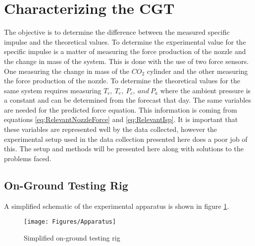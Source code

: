 \section{Characterizing the CGT}
The objective is to determine the difference between the measured specific impulse and the theoretical values. To determine the experimental value for the specific impulse is a matter of measuring the force production of the nozzle and the change in mass of the system. This is done with the use of two force sensors. One measuring the change in mass of the $CO_2$ cylinder and the other measuring the force production of the nozzle. To determine the theoretical values for the same system requires measuring $T_c,\ T_e,\ P_c,\ and\ P_a$ where the ambient pressure is a constant and can be determined from the forecast that day. The same variables are needed for the predicted force equation. This information is coming from equations \ref{eq:RelevantNozzleForce} and \ref{eq:RelevantIsp}. It is important that these variables are represented well by the data collected, however the experimental setup used in the data collection presented here does a poor job of this. The setup and methods will be presented here along with solutions to the problems faced. 
\subsection{On-Ground Testing Rig}
A simplified schematic of the experimental apparatus is shown in figure \ref{fig:ApparatusSchem}.
\begin{figure}[h!]
\centering
\texttt{[image: Figures/Apparatus]}
\caption{Simplified on-ground testing rig}
\label{fig:ApparatusSchem}
\end{figure}
